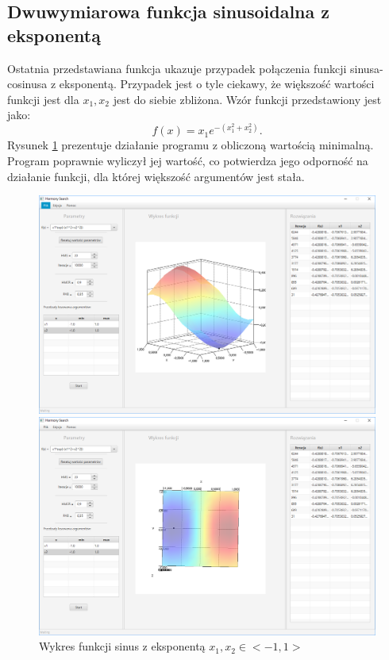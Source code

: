 \documentclass[10pt, a4paper]{article}
\begin{document}
\subsection{Dwuwymiarowa funkcja sinusoidalna z eksponentą}
\label{subsec:sinexp}
Ostatnia przedstawiana funkcja ukazuje przypadek połączenia funkcji sinusa-cosinusa z eksponentą. Przypadek jest o tyle ciekawy, że większość wartości funkcji jest dla {\em $x_{1}, x_{2}$} jest do siebie zbliżona. Wzór funkcji przedstawiony jest jako: $$f(x)=x_{1}e^{-(x_{1}^{2}+x_{2}^2)}.$$ Rysunek \ref{fig:9} prezentuje działanie programu z obliczoną wartością minimalną. Program poprawnie wyliczył jej wartość, co potwierdza jego odporność na działanie funkcji, dla której większość argumentów jest stała. 
\begin{figure}[htbp] 
	\begin{minipage}[b]{.5\textwidth}
		\centering
		\includegraphics[width=\linewidth]{images/91.PNG}
	\end{minipage} 
	\begin{minipage}[b]{.5\textwidth}
		\centering
		\includegraphics[width=\linewidth]{images/92.PNG} 
	\end{minipage}
	\label{fig:9}
	\caption{Wykres funkcji sinus z eksponentą $x_{1}, x_{2} \in <-1,1>$}
\end{figure}
\end{document}
